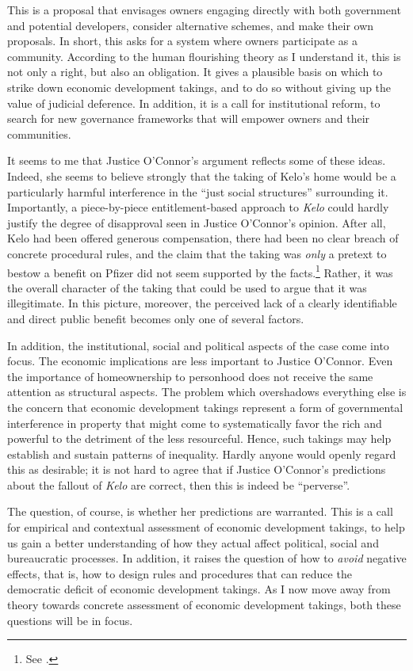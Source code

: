 \documentclass[12pt,a4paper]{book} %
\begin{document}
This is a proposal that envisages owners engaging directly with both government and potential developers, consider alternative schemes, and make their own proposals. In short, this asks for a system where owners participate as a community. According to the human flourishing theory as I understand it, this is not only a right, but also an obligation. It gives a plausible basis on which to strike down economic development takings, and to do so without giving up the value of judicial deference. In addition, it is a call for institutional reform, to search for new governance frameworks that will empower owners and their communities.

It seems to me that Justice O'Connor's argument reflects some of these ideas. Indeed, she seems to believe strongly that the taking of Kelo's home would be a particularly harmful interference in the ``just social structures'' surrounding it. Importantly, a piece-by-piece entitlement-based approach to {\it Kelo} could hardly justify the degree of disapproval seen in Justice O'Connor's opinion. After all, Kelo had been offered generous compensation, there had been no clear breach of concrete procedural rules, and the claim that the taking was {\it only} a pretext to bestow a benefit on Pfizer did not seem supported by the facts.\footnote{See \cite{bell06}.} Rather, it was the overall character of the taking that could be used to argue that it was illegitimate. In this picture, moreover, the perceived lack of a clearly identifiable and direct public benefit becomes only one of several factors.

In addition, the institutional, social and political aspects of the case come into focus. The economic implications are less important to Justice O'Connor. Even the importance of homeownership to personhood does not receive the same attention as structural aspects. The problem which overshadows everything else is the concern that economic development takings represent a form of governmental interference in property that might come to systematically favor the rich and powerful to the detriment of the less resourceful. Hence, such takings may help establish and sustain patterns of inequality. Hardly anyone would openly regard this as desirable; it is not hard to agree that if Justice O'Connor's predictions about the fallout of {\it Kelo} are correct, then this is indeed be ``perverse''. 

The question, of course, is whether her predictions are warranted. This is a call for empirical and contextual assessment of economic development takings, to help us gain a better understanding of how they actual affect political, social and bureaucratic processes. In addition, it raises the question of how to {\it avoid} negative effects, that is, how to design rules and procedures that can reduce the democratic deficit of economic development takings. As I now move away from theory towards concrete assessment of economic development takings, both these questions will be in focus.
\end{document}
